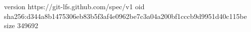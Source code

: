 version https://git-lfs.github.com/spec/v1
oid sha256:d344a8b1475306eb83b5f3af4e0962be7c3a04a200bf1cccb9d9951d40c115be
size 349692

